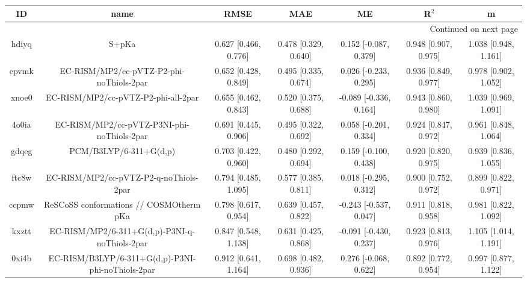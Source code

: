 \documentclass{article}
\begin{document}
\begin{center}
\begin{longtable}{|ccccccc|}
\toprule
    ID &                                               name &                  RMSE &                   MAE &                       ME &                 R$^2$ &                      m \\
\midrule
\endhead
\midrule
\multicolumn{7}{r}{{Continued on next page}} \\
\midrule
\endfoot

\bottomrule
\endlastfoot
 hdiyq &                                              S+pKa &  0.627 [0.466, 0.776] &  0.478 [0.329, 0.640] &    0.152 [-0.087, 0.379] &  0.948 [0.907, 0.975] &   1.038 [0.948, 1.161] \\
 epvmk &           EC-RISM/MP2/cc-pVTZ-P2-phi-noThiols-2par &  0.652 [0.428, 0.849] &  0.495 [0.335, 0.674] &    0.026 [-0.233, 0.295] &  0.936 [0.849, 0.977] &   0.978 [0.902, 1.052] \\
 xnoe0 &                EC-RISM/MP2/cc-pVTZ-P2-phi-all-2par &  0.655 [0.462, 0.843] &  0.520 [0.375, 0.688] &   -0.089 [-0.336, 0.164] &  0.943 [0.860, 0.980] &   1.039 [0.969, 1.091] \\
 4o0ia &         EC-RISM/MP2/cc-pVTZ-P3NI-phi-noThiols-2par &  0.691 [0.445, 0.906] &  0.495 [0.322, 0.692] &    0.058 [-0.201, 0.334] &  0.924 [0.847, 0.972] &   0.961 [0.848, 1.064] \\
 gdqeg &                             PCM/B3LYP/6-311+G(d,p) &  0.703 [0.422, 0.960] &  0.480 [0.292, 0.694] &    0.159 [-0.100, 0.438] &  0.920 [0.820, 0.975] &   0.939 [0.836, 1.055] \\
 ftc8w &             EC-RISM/MP2/cc-pVTZ-P2-q-noThiols-2par &  0.794 [0.485, 1.095] &  0.577 [0.385, 0.811] &    0.018 [-0.295, 0.312] &  0.900 [0.752, 0.972] &   0.899 [0.822, 0.971] \\
 ccpmw &            ReSCoSS conformations // COSMOtherm pKa &  0.798 [0.617, 0.954] &  0.639 [0.457, 0.822] &   -0.243 [-0.537, 0.047] &  0.911 [0.818, 0.958] &   0.981 [0.822, 1.092] \\
 kxztt &      EC-RISM/MP2/6-311+G(d,p)-P3NI-q-noThiols-2par &  0.847 [0.548, 1.138] &  0.631 [0.425, 0.868] &   -0.091 [-0.430, 0.237] &  0.923 [0.813, 0.976] &   1.105 [1.014, 1.191] \\
 0xi4b &  EC-RISM/B3LYP/6-311+G(d,p)-P3NI-phi-noThiols-2par &  0.912 [0.641, 1.164] &  0.698 [0.482, 0.936] &    0.276 [-0.068, 0.622] &  0.892 [0.772, 0.954] &   0.997 [0.877, 1.122] \\

\end{longtable}
\end{center}
\end{document}
